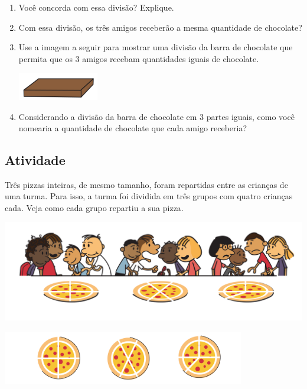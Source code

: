 \begin{enumerate} [\quad a)] %
  \item     Você concorda com essa divisão? Explique.
  \item     Com essa divisão, os três amigos receberão a mesma quantidade de chocolate?
  \item     Use a imagem a seguir para mostrar uma divisão da barra de chocolate que permita que os 3 amigos recebam quantidades iguais de chocolate. 
    \begin{center}
    \includegraphics[width=100pt, keepaspectratio]{..//media/cap1/secoes/pngs_licao_01/ativ1_fig02a.png}  
  \end{center}
  \item     Considerando a divisão da barra de chocolate em 3 partes iguais, como você nomearia a quantidade de chocolate que cada amigo receberia? 
\end{enumerate} %

\subsection{Atividade}
Três pizzas inteiras, de mesmo tamanho, foram repartidas entre as crianças de uma turma. Para isso, a turma foi dividida em três grupos com quatro crianças cada. Veja como cada grupo repartiu a sua pizza.

  \begin{center}
    \includegraphics[width=400pt, keepaspectratio]{..//media/cap1/secoes/pngs_licao_01/ativ2_fig01.png}
    
    \includegraphics[width=300pt, keepaspectratio]{..//media/cap1/secoes/pngs_licao_01/ativ2_fig02.png}  
  \end{center}

